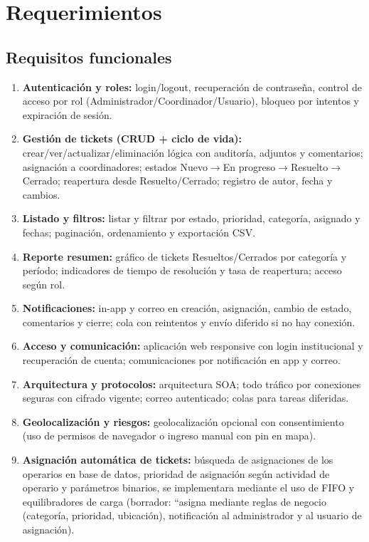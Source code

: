 \documentclass[12pt,a4paper]{article}
\begin{document}
\section{Requerimientos}

\subsection{Requisitos funcionales}

\begin{enumerate}
    \item \textbf{Autenticación y roles:} login/logout, recuperación de contraseña, control de acceso por rol (Administrador/Coordinador/Usuario), bloqueo por intentos y expiración de sesión.
    
    \item \textbf{Gestión de tickets (CRUD + ciclo de vida):} crear/ver/actualizar/eliminación lógica con auditoría, adjuntos y comentarios; asignación a coordinadores; estados Nuevo$\rightarrow$En progreso$\rightarrow$Resuelto$\rightarrow$Cerrado; reapertura desde Resuelto/Cerrado; registro de autor, fecha y cambios.
    
    \item \textbf{Listado y filtros:} listar y filtrar por estado, prioridad, categoría, asignado y fechas; paginación, ordenamiento y exportación CSV.
    
    \item \textbf{Reporte resumen:} gráfico de tickets Resueltos/Cerrados por categoría y período; indicadores de tiempo de resolución y tasa de reapertura; acceso según rol.
    
    \item \textbf{Notificaciones:} in-app y correo en creación, asignación, cambio de estado, comentarios y cierre; cola con reintentos y envío diferido si no hay conexión.
    
    \item \textbf{Acceso y comunicación:} aplicación web responsive con login institucional y recuperación de cuenta; comunicaciones por notificación en app y correo.
    
    \item \textbf{Arquitectura y protocolos:} arquitectura SOA; todo tráfico por conexiones seguras con cifrado vigente; correo autenticado; colas para tareas diferidas.
    
    \item \textbf{Geolocalización y riesgos:} geolocalización opcional con consentimiento (uso de permisos de navegador o ingreso manual con pin en mapa).
    
    \item \textbf{Asignación automática de tickets:} búsqueda de asignaciones de los operarios en base de datos, prioridad de asignación según actividad de operario y parámetros binarios, se implementara mediante el uso de FIFO y equilibradores de carga (borrador: ``asigna mediante reglas de negocio (categoría, prioridad, ubicación), notificación al administrador y al usuario de asignación).
\end{enumerate}
\end{document}
